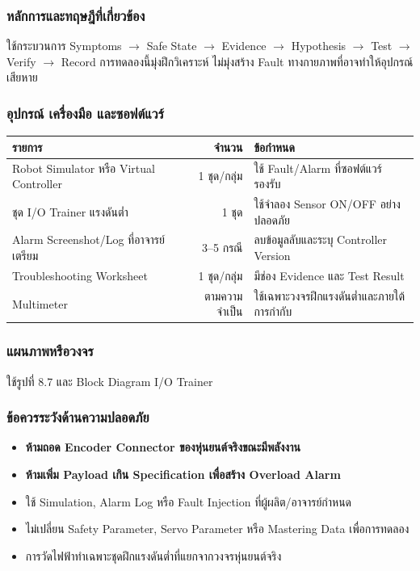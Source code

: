 \subsubsection{หลักการและทฤษฎีที่เกี่ยวข้อง}

ใช้กระบวนการ Symptoms \(\rightarrow\) Safe State \(\rightarrow\) Evidence \(\rightarrow\) Hypothesis \(\rightarrow\) Test \(\rightarrow\) Verify \(\rightarrow\) Record การทดลองนี้มุ่งฝึกวิเคราะห์ ไม่มุ่งสร้าง Fault ทางกายภาพที่อาจทำให้อุปกรณ์เสียหาย

\subsubsection{อุปกรณ์ เครื่องมือ และซอฟต์แวร์}

\begin{table}[htbp]
    \centering
    \begin{tabular}{l r l}
        \hline
        \textbf{รายการ} & \textbf{จำนวน} & \textbf{ข้อกำหนด} \\
        \hline
        Robot Simulator หรือ Virtual Controller & 1 ชุด/กลุ่ม & ใช้ Fault/Alarm ที่ซอฟต์แวร์รองรับ \\
        ชุด I/O Trainer แรงดันต่ำ & 1 ชุด & ใช้จำลอง Sensor ON/OFF อย่างปลอดภัย \\
        Alarm Screenshot/Log ที่อาจารย์เตรียม & 3–5 กรณี & ลบข้อมูลลับและระบุ Controller Version \\
        Troubleshooting Worksheet & 1 ชุด/กลุ่ม & มีช่อง Evidence และ Test Result \\
        Multimeter & ตามความจำเป็น & ใช้เฉพาะวงจรฝึกแรงดันต่ำและภายใต้การกำกับ \\
        \hline
    \end{tabular}
\end{table}

\subsubsection{แผนภาพหรือวงจร}

ใช้รูปที่ 8.7 และ Block Diagram I/O Trainer

\subsubsection{ข้อควรระวังด้านความปลอดภัย}

\begin{itemize}
    \item \textbf{ห้ามถอด Encoder Connector ของหุ่นยนต์จริงขณะมีพลังงาน}
    \item \textbf{ห้ามเพิ่ม Payload เกิน Specification เพื่อสร้าง Overload Alarm}
    \item ใช้ Simulation, Alarm Log หรือ Fault Injection ที่ผู้ผลิต/อาจารย์กำหนด
    \item ไม่เปลี่ยน Safety Parameter, Servo Parameter หรือ Mastering Data เพื่อการทดลอง
    \item การวัดไฟฟ้าทำเฉพาะชุดฝึกแรงดันต่ำที่แยกจากวงจรหุ่นยนต์จริง
\end{itemize}

